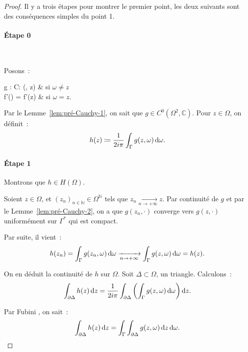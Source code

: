 \documentclass{report}
\theoremstyle{definition}
\theoremstyle{remark}
\numberwithin{equation}{section}
\newcommand{\C}{\mathbb C}
\newcommand{\N}{\mathbb N}
\newcommand{\pinfty}{{+\infty}}
\begin{document}
			\begin{proof} Il y a trois étapes pour montrer le premier point, les deux suivants sont des conséquences simples du point 1.

			\paragraph*{Étape 0}~

			Posons~:
			\begin{subnumcases}
				{g : \Omega \times \Omega \to \C : (\omega, z) \mapsto}
					 & si $\omega \neq z$ \\
					f'(\omega) = f'(z) & si $\omega = z$.
			\end{subnumcases}

			Par le Lemme~\ref{lem:pré-Cauchy-1}, on sait que $g \in C^0(\Omega^2, \C)$. Pour $z \in \Omega$, on définit~:
			\begin{equation}
				h(z) \coloneqq \frac 1{2i\pi}\int_\Gamma g(z, \omega)\dif \omega.
			\end{equation}

			\paragraph*{Étape 1} Montrons que $h \in H(\Omega)$.

			Soient $z \in \Omega$, et $(z_n)_{n \in \N} \in \Omega^\N$ tels que $z_n \xrightarrow[n \to \pinfty]{} z$. Par continuité de $g$ et par le
			Lemme~\ref{lem:pré-Cauchy-2}, on a que $g(z_n, \cdot)$ converge vers $g(z, \cdot)$ uniformément sur $\Gamma^*$ qui est compact.

			Par suite, il vient~:
			\begin{equation}
				h(z_n) = \int_\Gamma g(z_n, \omega)\dif \omega \xrightarrow[n \to \pinfty]{} \int_\Gamma g(z, \omega)\dif \omega = h(z).
			\end{equation}

			On en déduit la continuité de $h$ sur $\Omega$. Soit $\Delta \subset \Omega$, un triangle. Calculons~:
			\begin{equation}
				\int_{\partial \Delta}h(z)\dif z = \frac 1{2i\pi}\int_{\partial \Delta}\left(\int_\Gamma g(z, \omega)\dif \omega\right)\dif z.
			\end{equation}

			Par Fubini , on sait~:
			\begin{equation}
				\int_{\partial \Delta}h(z)\dif z = \int_\Gamma\int_{\partial \Delta}g(z, \omega)\dif z\dif\omega.
			\end{equation}


\end{proof}
\end{document}
